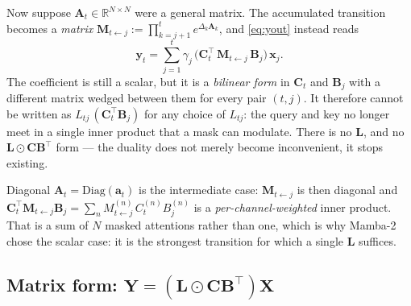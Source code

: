 \documentclass[11pt,a4paper]{article}
\begin{document}
Now suppose $\bm{A}_t\in\mathbb{R}^{N\times N}$ were a general matrix.
The accumulated transition becomes a \emph{matrix}
$\bm{M}_{t\leftarrow j} := \prod_{k=j+1}^{t}e^{\Delta_k\bm{A}_k}$, and
\eqref{eq:yout} instead reads
\begin{equation}\label{eq:no-duality}
  \bm{y}_t = \sum_{j=1}^{t}\gamma_j\,
    \bigl(\bm{C}_t^\top\,\bm{M}_{t\leftarrow j}\,\bm{B}_j\bigr)\,\bm{x}_j .
\end{equation}
The coefficient is still a scalar, but it is a \emph{bilinear form} in
$\bm{C}_t$ and $\bm{B}_j$ with a different matrix wedged between them
for every pair $(t,j)$. It therefore cannot be written as
$L_{tj}\,(\bm{C}_t^\top\bm{B}_j)$ for any choice of $L_{tj}$: the query
and key no longer meet in a single inner product that a mask can
modulate. There is no $\bm{L}$, and no
$\bm{L}\odot\bm{C}\bm{B}^\top$ form --- the duality does not merely
become inconvenient, it stops existing.

Diagonal $\bm{A}_t=\mathrm{Diag}(\bm{a}_t)$ is the intermediate case:
$\bm{M}_{t\leftarrow j}$ is then diagonal and
$\bm{C}_t^\top\bm{M}_{t\leftarrow j}\bm{B}_j
= \sum_n M^{(n)}_{t\leftarrow j}\,C_t^{(n)}B_j^{(n)}$ is a
\emph{per-channel-weighted} inner product. That is a sum of $N$ masked
attentions rather than one, which is why Mamba-2 chose the scalar case:
it is the strongest transition for which a single $\bm{L}$ suffices.

\subsection{Matrix form: \texorpdfstring{$\bm{Y} = (\bm{L}\odot \bm{C}\bm{B}^\top)\bm{X}$}{Y = (L .* C B-transpose) X}}
\end{document}
